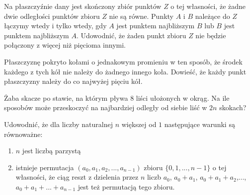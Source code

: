 \documentclass{article}
\begin{document}
\begin{zadanie}
  Na płaszczyźnie dany jest skończony zbiór punktów $Z$ o tej własności, że żadne dwie odległości punktów zbioru $Z$ nie są równe. Punkty $A$ i $B$ należące do $Z$ łączymy wtedy i tylko wtedy, gdy $A$ jest punktem najbliższym $B$ lub $B$ jest punktem najbliższym $A$. Udowodnić, że żaden punkt zbioru $Z$ nie będzie połączony z więcej niż pięcioma innymi.
\end{zadanie}


\begin{zadanie}
  Płaszczyznę pokryto kołami o jednakowym promieniu w ten sposób, że środek każdego z tych kół nie należy do żadnego innego koła. Dowieść, że każdy punkt płaszczyzny należy do co najwyżej pięciu kół.
\end{zadanie}


\begin{zadanie}
  Żaba skacze po stawie, na którym pływa $8$ liści ułożonych w okrąg. Na ile sposobów może przeskoczyć na najbardziej odległy od siebie liść w $2n$ skokach?
\end{zadanie}


\begin{zadanie}
  Udowodnić, że dla liczby naturalnej $n$ większej od $1$ następujące warunki są równoważne:
  \begin{enumerate}[label=\alph*)]
    \item $n$ jest liczbą parzystą
    \item istnieje permutacja $(a_0, a_1, a_2,..., a_{n-1})$ zbioru $\{0,1,...,n-1\}$ o tej własności, że ciąg reszt z dzielenia przez $n$ liczb $a_0$, $a_0+a_1$, $a_0+a_1+a_2$,..., $a_0+a_1+...+a_{n-1}$ jest też permutacją tego zbioru.
  \end{enumerate}
\end{zadanie}
\end{document}
